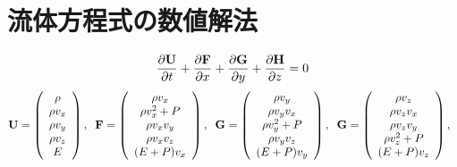 \chapter{ 流体方程式の数値解法}

\begin{equation}
    \frac{\partial {\bf U}}{\partial t} 
    + \frac{\partial {\bf F}}{\partial x}
    + \frac{\partial {\bf G}}{\partial y}
    + \frac{\partial {\bf H}}{\partial z}=0
\end{equation}
\begin{equation}
    {\bf U} = \left( 
        \begin{array}{c}
            \rho \\
            \rho v_x \\
            \rho v_y \\
            \rho v_z \\
            E
    \end{array}
\right),\;\;
    {\bf F} = \left( 
        \begin{array}{c}
            \rho v_x \\
            \rho v_x^2 + P \\
            \rho v_x v_y \\
            \rho v_x v_z \\
            (E + P)v_x
    \end{array}
\right),\;\;
    {\bf G} = \left( 
        \begin{array}{c}
            \rho v_y \\
            \rho v_y v_x \\
            \rho v_y^2 + P \\
            \rho v_y v_z \\
            (E + P)v_y
    \end{array}
\right),\;\;
    {\bf G} = \left( 
        \begin{array}{c}
            \rho v_z \\
            \rho v_z v_x \\
            \rho v_z v_y \\
            \rho v_z^2 + P  \\
            (E + P)v_z
    \end{array}
\right),\;\;
\end{equation}

\newpage
